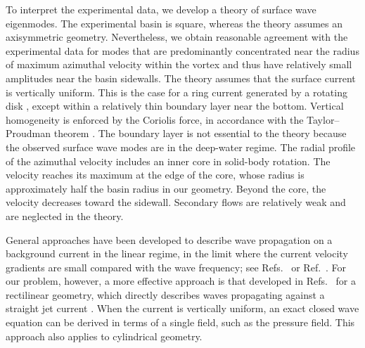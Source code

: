 \documentclass[aps,twocolumn]{revtex4-2}
\begin{document}
To interpret the experimental data, we develop a theory of surface wave eigenmodes. The experimental basin is square, whereas the theory assumes an axisymmetric geometry. Nevertheless, we obtain reasonable agreement with the experimental data for modes that are predominantly concentrated near the radius of maximum azimuthal velocity within the vortex and thus have relatively small amplitudes near the basin sidewalls. The theory assumes that the surface current is vertically uniform. This is the case for a ring current generated by a rotating disk \cite{yang2019axisymmetric}, except within a relatively thin boundary layer near the bottom. Vertical homogeneity is enforced by the Coriolis force, in accordance with the Taylor–Proudman theorem \cite{davidson2024dynamics}. The boundary layer is not essential to the theory because the observed surface wave modes are in the deep-water regime. The radial profile of the azimuthal velocity includes an inner core in solid-body rotation. The velocity reaches its maximum at the edge of the core, whose radius is approximately half the basin radius in our geometry. Beyond the core, the velocity decreases toward the sidewall. Secondary flows are relatively weak and are neglected in the theory.

General approaches have been developed to describe wave propagation on a background current in the linear regime, in the limit where the current velocity gradients are small compared with the wave frequency; see Refs.~\cite{vergeles2024role,vergeles2025nonlinear} or Ref.~\cite{mcwilliams2022quasi}. For our problem, however, a more effective approach is that developed in Refs.~\cite{shrira2014trapped,shrira2014nonlinear} for a rectilinear geometry, which directly describes waves propagating against a straight jet current \cite{lavrenov1998wave,holthuijsen1991effects}. When the current is vertically uniform, an exact closed wave equation can be derived in terms of a single field, such as the pressure field. This approach also applies to cylindrical geometry.
\end{document}
